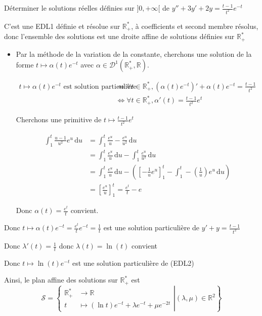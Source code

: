 \documentclass{article}
\renewenvironment{question_kholle}[2][ ]
{
	\subsection{\texorpdfstring{#2}{}}
	\notblank{#1}
	{
		\noindent #1
		\bigbreak
	}
	{}
	\begin{proof}
}
{
	\end{proof}
}
\begin{document}
\begin{question_kholle}[]{Déterminer le solutions réelles définies sur $]0, + \infty [$ de $y'' + 3y' +2y = \frac{t-1}{t^{2}}e^{ -t }$}
\begin{itemize}[label=$\star$]
\begin{itemize}[label=$\lozenge$]
C'est une EDL1 définie et résolue sur $\mathbb{R}_{+}^{*}$, à coefficients et second membre résolus, donc l'ensemble des solutions est une droite affine de solutions définies sur $\mathbb{R}_{+}^{*}$

\begin{itemize}[label=$\triangle$] 
  \item Par la méthode de la variation de la constante, cherchons une solution de la forme $t \mapsto \alpha (t) e^{ -t }$ avec $\alpha \in \mathcal{D}^{1}(\mathbb{R}_{+}^{*}, \mathbb{R})$.


\begin{align*}
t \mapsto \alpha(t)e^{ -t } \text{ est solution particulière } &\iff \forall t \in \mathbb{R}_{+}^{*}, (\alpha(t)e^{ -t })' + \alpha(t)e^{ -t }= \frac{t-1}{t^{2}}\\
&\iff \forall t \in \mathbb{R}_{+}^{*}, \alpha'(t) = \frac{t-1}{t^{2}}e^{ t }
\end{align*}


Cherchons une primitive de $t \mapsto \frac{t-1}{t^{2}}e^{ t }$


\begin{align*}
\int_{1}^{t} \frac{u-1}{u^{2}}e^{ u } \, \mathrm du &= \int_{1}^{t} \frac{e^{ u }}{u} - \frac{e^{ u }}{u^{2}} \, \mathrm du \\
&= \int_{1}^{t} \frac{e^{ u }}{u} \, \mathrm du - \int_{1}^{t} \frac{e^{ u }}{u^{2}} \, \mathrm du \\
&= \int_{1}^{t} \frac{e^{ u }}{u} \, \mathrm du  - \left( \left[ -\frac{1}{u}e^{ u } \right] _{1}^{t} - \int_{1}^{t} -\left( \frac{1}{u} \right) e^{ u } \, \mathrm du  \right)   \\
&= \left[ \frac{e^{ u }}{u} \right] _{1}^{t} = \frac{e^{t}}{t} - e
\end{align*}


Donc $\alpha(t) = \frac{e^{ t }}{t}$ convient.
\end{itemize}

Donc $t \mapsto \alpha(t)e^{ -t } = \frac{e^{ t }}{t}e^{ -t } = \frac{1}{t}$ est une solution particulière de $y'+y = \frac{t-1}{t^{2}}$
\end{itemize}
Donc $\lambda'(t) = \frac{1}{t}$ donc $\lambda(t) = \ln(t)$ convient

Donc $t \mapsto \ln (t) e^{ -t }$ est une solution particulière de (EDL2)
\end{itemize}
Ainsi, le plan affine des solutions sur $\mathbb{R}_{+}^{*}$ est
$$
\mathcal{S} = \left\{ \left.\begin{array}{ll} \mathbb{R}_{+}^{*} &\to \mathbb{R} \\ t &\mapsto (\ln t)e^{ -t }+ \lambda e^{ -t }+\mu e^{ -2t } \end{array}\right| (\lambda , \mu) \in \mathbb{R}^{2}\right\} 
$$

\end{question_kholle}
\end{document}
